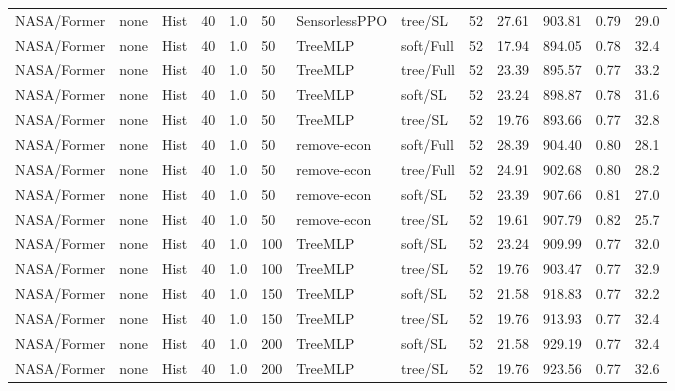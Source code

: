 \documentclass[10pt,a4paper]{article}
\begin{document}
\begin{landscape}
\begin{longtable}{llllllllrrrrr}
NASA/Former & none & Hist & 40 & 1.0 & 50 & SensorlessPPO & tree/SL & 52 & 27.61 & 903.81 & 0.79 & 29.0 \\

NASA/Former & none & Hist & 40 & 1.0 & 50 & TreeMLP & soft/Full & 52 & 17.94 & 894.05 & 0.78 & 32.4 \\

NASA/Former & none & Hist & 40 & 1.0 & 50 & TreeMLP & tree/Full & 52 & 23.39 & 895.57 & 0.77 & 33.2 \\

NASA/Former & none & Hist & 40 & 1.0 & 50 & TreeMLP & soft/SL & 52 & 23.24 & 898.87 & 0.78 & 31.6 \\

NASA/Former & none & Hist & 40 & 1.0 & 50 & TreeMLP & tree/SL & 52 & 19.76 & 893.66 & 0.77 & 32.8 \\

NASA/Former & none & Hist & 40 & 1.0 & 50 & remove-econ & soft/Full & 52 & 28.39 & 904.40 & 0.80 & 28.1 \\

NASA/Former & none & Hist & 40 & 1.0 & 50 & remove-econ & tree/Full & 52 & 24.91 & 902.68 & 0.80 & 28.2 \\

NASA/Former & none & Hist & 40 & 1.0 & 50 & remove-econ & soft/SL & 52 & 23.39 & 907.66 & 0.81 & 27.0 \\

NASA/Former & none & Hist & 40 & 1.0 & 50 & remove-econ & tree/SL & 52 & 19.61 & 907.79 & 0.82 & 25.7 \\

NASA/Former & none & Hist & 40 & 1.0 & 100 & TreeMLP & soft/SL & 52 & 23.24 & 909.99 & 0.77 & 32.0 \\

NASA/Former & none & Hist & 40 & 1.0 & 100 & TreeMLP & tree/SL & 52 & 19.76 & 903.47 & 0.77 & 32.9 \\

NASA/Former & none & Hist & 40 & 1.0 & 150 & TreeMLP & soft/SL & 52 & 21.58 & 918.83 & 0.77 & 32.2 \\

NASA/Former & none & Hist & 40 & 1.0 & 150 & TreeMLP & tree/SL & 52 & 19.76 & 913.93 & 0.77 & 32.4 \\

NASA/Former & none & Hist & 40 & 1.0 & 200 & TreeMLP & soft/SL & 52 & 21.58 & 929.19 & 0.77 & 32.4 \\

NASA/Former & none & Hist & 40 & 1.0 & 200 & TreeMLP & tree/SL & 52 & 19.76 & 923.56 & 0.77 & 32.6 \\


\end{longtable}
\end{landscape}
\end{document}
